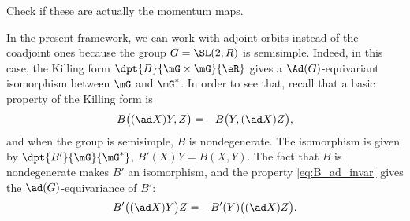 \begin{probleme} 
	Check if these are actually the momentum maps.
\label{ProbMom}
\end{probleme}

In the present framework, we can work with adjoint orbits instead of the coadjoint ones because the group $G=\SL(2,R)$ is semisimple. Indeed, in this case, the Killing form $\dpt{B}{\mG\times\mG}{\eR}$ gives a $\Ad(G)$-equivariant isomorphism between $\mG$ and $\mG^*$. In order to see that, recall that a basic property of the Killing form is
\begin{equation}\label{eq:B_ad_invar}
   B\big( (\ad X)Y,Z \big)=-B\big(Y, (\ad X)Z \big),
\end{equation}
and when the group is semisimple, $B$ is nondegenerate. The isomorphism is given by
$\dpt{B'}{\mG}{\mG^*}$, $B'(X)Y=B(X,Y)$. The fact that $B$ is nondegenerate makes $B'$ an isomorphism, and the property \eqref{eq:B_ad_invar} gives the $\ad(G)$-equivariance of $B'$:
\[
   B'\big( (\ad X)Y \big)Z=-B'(Y)\big( (\ad X)Z\big).
\]

